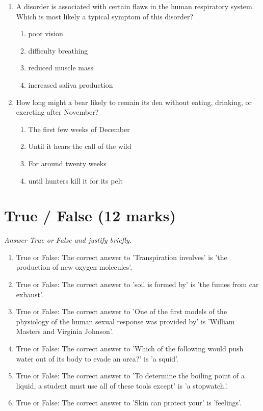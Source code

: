 \documentclass[12pt]{article}
\begin{document}
\begin{enumerate}[label=\arabic*.]
\begin{enumerate}[label=(\alph*)]
    \item The development of a legal framework to protect those within the state
    \item To provide housing for all those homeless within a state
\end{enumerate}
\item A disorder is associated with certain flaws in the human respiratory system. Which is most likely a typical symptom of this disorder?
\begin{enumerate}[label=(\alph*)]
    \item poor vision
    \item difficulty breathing
    \item reduced muscle mass
    \item increased saliva production
\end{enumerate}
\item How long might a bear likely to remain its den without eating, drinking, or excreting after November?
\begin{enumerate}[label=(\alph*)]
    \item The first few weeks of December
    \item Until it hears the call of the wild
    \item For around twenty weeks
    \item until hunters kill it for its pelt
\end{enumerate}
\end{enumerate}

\section*{True / False (12 marks)}
\textit{Answer True or False and justify briefly.}
\begin{enumerate}[label=\arabic*.]
\item True or False: The correct answer to 'Transpiration involves' is 'the production of new oxygen molecules'.
\item True or False: The correct answer to 'soil is formed by' is 'the fumes from car exhaust'.
\item True or False: The correct answer to 'One of the first models of the physiology of the human sexual response was provided by' is 'William Masters and Virginia Johnson'.
\item True or False: The correct answer to 'Which of the following would push water out of its body to evade an orca?' is 'a squid'.
\item True or False: The correct answer to 'To determine the boiling point of a liquid, a student must use all of these tools except' is 'a stopwatch.'.
\item True or False: The correct answer to 'Skin can protect your' is 'feelings'.
\end{enumerate}
\end{document}
